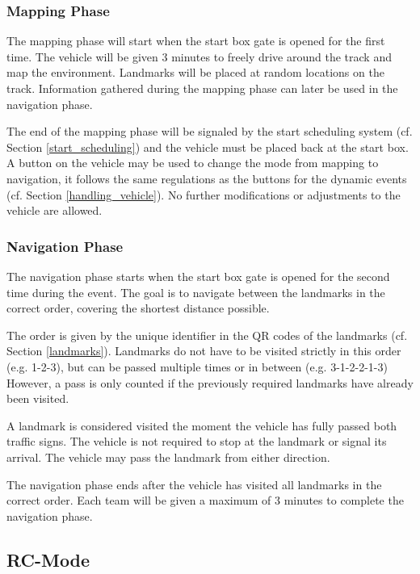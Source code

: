 \begin{highlight}[yellow]
    \subsubsection{Mapping Phase}

    The mapping phase will start when the start box gate is opened for the first
    time. The vehicle will be given 3 minutes to freely drive around the track and
    map the environment. Landmarks will be placed at random locations on the track.
    Information gathered during the mapping phase can later be used in the
    navigation phase.

    The end of the mapping phase will be signaled by the start scheduling system
    (cf. Section \ref{start_scheduling}) and the vehicle must be placed back at the
    start box. A button on the vehicle may be used to change the mode from mapping
    to navigation, it follows the same regulations as the buttons for the dynamic
    events (cf. Section \ref{handling_vehicle}). No further modifications or
    adjustments to the vehicle are allowed.

    \subsubsection{Navigation Phase}

    The navigation phase starts when the start box gate is opened for the second
    time during the event. The goal is to navigate between the landmarks in the
    correct order, covering the shortest distance possible.

    The order is given by the unique identifier in the QR codes of the landmarks
    (cf. Section \ref{landmarks}). Landmarks do not have to be visited strictly in
    this order (e.g. 1-2-3), but can be passed multiple times or in between (e.g.
    3-1-2-2-1-3) However, a pass is only counted if the previously required
    landmarks have already been visited.

    A landmark is considered visited the moment the vehicle has fully passed both
    traffic signs. The vehicle is not required to stop at the landmark or signal
    its arrival. The vehicle may pass the landmark from either direction.

    The navigation phase ends after the vehicle has visited all landmarks in the
    correct order. Each team will be given a maximum of 3 minutes to complete the
    navigation phase.

    \subsection{RC-Mode}


\end{highlight}
